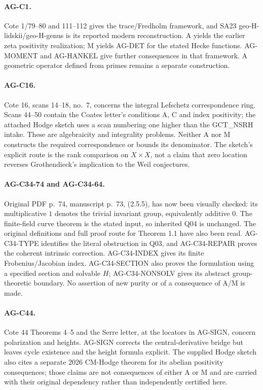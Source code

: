 \documentclass[11pt,a4paper]{article}
\begin{document}
\paragraph{AG-C1.} Cote 1/79--80 and 111--112 gives the trace/Fredholm
framework, and SA23 geo-H-lidskii/geo-H-genus is its reported modern
reconstruction. A yields the earlier zeta positivity realization;
M yields AG-DET for the stated Hecke functions. AG-MOMENT and AG-HANKEL
give further consequences in that framework. A geometric operator defined
from primes remains a separate construction.

\paragraph{AG-C16.} Cote 16, scans 14--18, no.~7, concerns the integral
Lefschetz correspondence ring. Scans 44--50 contain the Coates letter's
conditions A, C and index positivity; the attached Hodge sketch uses a scan
numbering one higher than the GCT\_NSRH intake. These are algebraicity and
integrality problems. Neither A nor M constructs the required
correspondence or bounds its denominator. The sketch's explicit route is
the rank comparison on $X\times X$, not a claim that zero location
reverses Grothendieck's implication to the Weil conjectures.

\paragraph{AG-C34-74 and AG-C34-64.} Original PDF p.~74, manuscript p.~73, (2.5.5),
has now been visually checked: its multiplicative $1$ denotes the trivial
invariant group, equivalently additive $0$. The finite-field curve theorem
is the stated input, so inherited Q04 is unchanged. The original
definitions and full proof route for Theorem 1.1 have also been read.
AG-C34-TYPE identifies the literal obstruction in Q03, and
AG-C34-REPAIR proves the coherent intrinsic correction. AG-C34-INDEX
gives its finite Frobenius/Jacobian index. AG-C34-SECTION also proves
the formulation using a specified section and solvable $H$;
AG-C34-NONSOLV gives its abstract group-theoretic boundary.
No assertion of new purity or
of a consequence of A/M is made.

\paragraph{AG-C44.} Cote 44 Theorems 4--5 and the Serre letter, at the
locators in AG-SIGN, concern polarization and heights. AG-SIGN corrects
the central-derivative bridge but leaves cycle existence and the
height formula explicit. The supplied Hodge sketch also cites a separate
2026 CM-Hodge theorem for its abelian positivity consequences; those
claims are not consequences of either A or M and are carried with
their original dependency rather than independently certified here.
\end{document}
